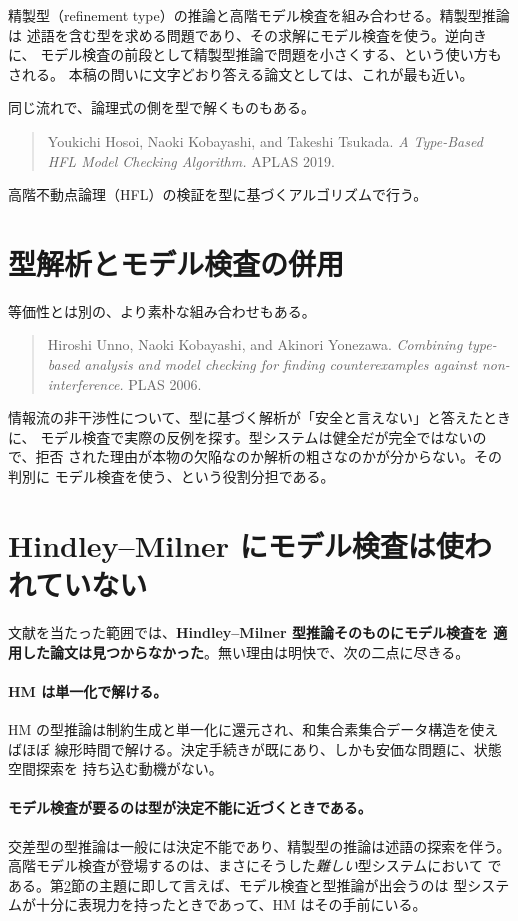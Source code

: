 \documentclass[11pt,a4paper]{ltjsarticle}
\begin{document}
精製型（refinement type）の推論と高階モデル検査を組み合わせる。精製型推論は
述語を含む型を求める問題であり、その求解にモデル検査を使う。逆向きに、
モデル検査の前段として精製型推論で問題を小さくする、という使い方もされる。
本稿の問いに文字どおり答える論文としては、これが最も近い。

同じ流れで、論理式の側を型で解くものもある。

\begin{quote}
Youkichi Hosoi, Naoki Kobayashi, and Takeshi Tsukada.
\emph{A Type-Based HFL Model Checking Algorithm.}
APLAS 2019.
\end{quote}

高階不動点論理（HFL）の検証を型に基づくアルゴリズムで行う。

\section{型解析とモデル検査の併用}

等価性とは別の、より素朴な組み合わせもある。

\begin{quote}
Hiroshi Unno, Naoki Kobayashi, and Akinori Yonezawa.
\emph{Combining type-based analysis and model checking for finding
counterexamples against non-interference.}
PLAS 2006.
\end{quote}

情報流の非干渉性について、型に基づく解析が「安全と言えない」と答えたときに、
モデル検査で実際の反例を探す。型システムは健全だが完全ではないので、拒否
された理由が本物の欠陥なのか解析の粗さなのかが分からない。その判別に
モデル検査を使う、という役割分担である。

\section{Hindley--Milner にモデル検査は使われていない}
\label{sec:hm}

文献を当たった範囲では、\textbf{Hindley--Milner 型推論そのものにモデル検査を
適用した論文は見つからなかった}。無い理由は明快で、次の二点に尽きる。

\paragraph{HM は単一化で解ける。}
HM の型推論は制約生成と単一化に還元され、和集合素集合データ構造を使えばほぼ
線形時間で解ける。決定手続きが既にあり、しかも安価な問題に、状態空間探索を
持ち込む動機がない。

\paragraph{モデル検査が要るのは型が決定不能に近づくときである。}
交差型の型推論は一般には決定不能であり、精製型の推論は述語の探索を伴う。
高階モデル検査が登場するのは、まさにそうした\emph{難しい}型システムにおいて
である。第\ref{sec:hm}節の主題に即して言えば、モデル検査と型推論が出会うのは
型システムが十分に表現力を持ったときであって、HM はその手前にいる。
\end{document}
